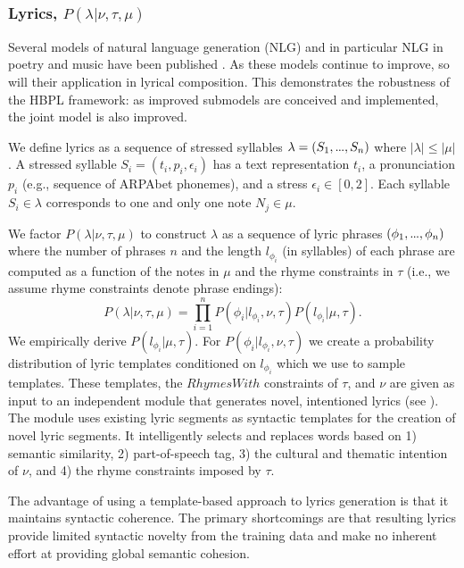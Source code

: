 \documentclass[phd,electronic,oneside,twosidetoc,letterpaper,chaptercenter,parttop,lof,lot]{byumsphd}
\newcommand\mydots{\hbox to .75em{.\hss.\hss.}}
\begin{document}
\subsubsection{Lyrics, $P(\lambda|\nu,\tau,\mu)$}

Several models of natural language generation (NLG) and in particular NLG in poetry and music have been published \cite{paris2013natural}. As these models continue to improve, so will their application in lyrical composition. This demonstrates the robustness of the HBPL framework: as improved submodels are conceived and implemented, the joint model is also improved.

We define lyrics as a sequence of stressed syllables $\lambda=(S_1,\mydots,S_n)$ where $|\lambda| \le |\mu|$. A stressed syllable $S_i = (t_i, p_i, \epsilon_i)$ has a text representation $t_i$, a pronunciation $p_i$ (e.g., sequence of ARPAbet phonemes), and a stress $\epsilon_i\in[0,2]$. Each syllable $S_i\in\lambda$ corresponds to one and only one note $N_j\in\mu$.

We factor $P(\lambda|\nu,\tau,\mu)$ to construct $\lambda$ as a sequence of lyric phrases $(\phi_1,\mydots,\phi_n)$ where the number of phrases $n$ and the length $l_{\phi_i}$ (in syllables) of each phrase are computed as a function of the notes in $\mu$ and the rhyme constraints in $\tau$ (i.e., we assume rhyme constraints denote phrase endings):
\[ P(\lambda|\nu,\tau,\mu) = \prod_{i=1}^n P(\phi_i | l_{\phi_i},\nu,\tau) P(l_{\phi_i} | \mu,\tau). \]
We empirically derive $P(l_{\phi_i} | \mu,\tau)$. For $P(\phi_i | l_{\phi_i},\nu,\tau)$ we create a probability distribution of lyric templates conditioned on $l_{\phi_i}$ which we use to sample templates. These templates, the $RhymesWith$ constraints of $\tau$, and $\nu$ are given as input to an independent module that generates novel, intentioned lyrics (see \citeauthor{bay2017ICCC} \cite{bay2017ICCC}). The module uses existing lyric segments as syntactic templates for the creation of novel lyric segments. It intelligently selects and replaces words based on 1) semantic similarity, 2) part-of-speech tag, 3) the cultural and thematic intention of $\nu$, and 4) the rhyme constraints imposed by $\tau$.

The advantage of using a template-based approach to lyrics generation is that it maintains syntactic coherence. The primary shortcomings are that resulting lyrics provide limited syntactic novelty from the training data and make no inherent effort at providing global semantic cohesion.
\end{document}
